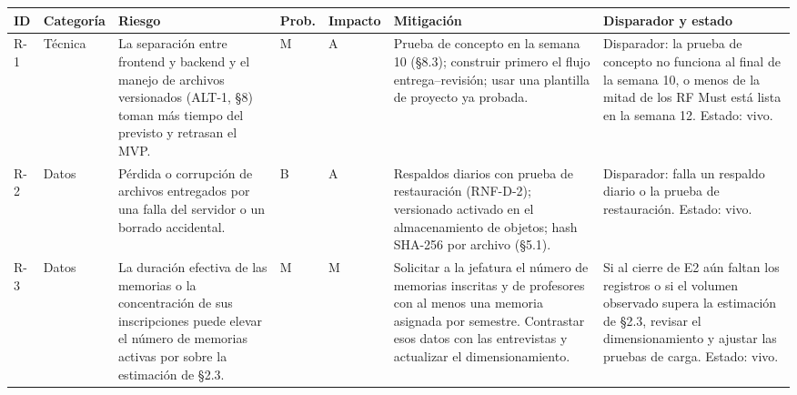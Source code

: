 \documentclass[10pt,a4paper]{article}
\newcommand{\hrow}{\rowcolor{encabezado}}
\newcommand{\h}[1]{\textbf{#1}}
\begin{document}
\begin{xltabular}{\linewidth}{|P{0.8cm}|P{1.9cm}|L|P{0.9cm}|P{1.1cm}|P{3.4cm}|P{3.0cm}|}
\hline\hrow \h{ID} & \h{Categoría} & \h{Riesgo} & \h{Prob.} & \h{Impacto} & \h{Mitigación} & \h{Disparador y estado} \\ \hline
\endhead
R-1 & Técnica & La separación entre frontend y backend y el manejo de archivos versionados (ALT-1, §8) toman más tiempo del previsto y retrasan el MVP. & M & A & Prueba de concepto en la semana 10 (§8.3); construir primero el flujo entrega–revisión; usar una plantilla de proyecto ya probada. & Disparador: la prueba de concepto no funciona al final de la semana 10, o menos de la mitad de los RF Must está lista en la semana 12. Estado: vivo. \\ \hline

R-2 & Datos & Pérdida o corrupción de archivos entregados por una falla del servidor o un borrado accidental. & B & A & Respaldos diarios con prueba de restauración (RNF-D-2); versionado activado en el almacenamiento de objetos; hash SHA-256 por archivo (§5.1). & Disparador: falla un respaldo diario o la prueba de restauración. Estado: vivo. \\ \hline

R-3 & Datos & La duración efectiva de las memorias o la concentración de sus inscripciones puede elevar el número de memorias activas por sobre la estimación de §2.3. & M & M & Solicitar a la jefatura el número de memorias inscritas y de profesores con al menos una memoria asignada por semestre. Contrastar esos datos con las entrevistas y actualizar el dimensionamiento. & Si al cierre de E2 aún faltan los registros o si el volumen observado supera la estimación de §2.3, revisar el dimensionamiento y ajustar las pruebas de carga. Estado: vivo. \\ \hline


\end{xltabular}
\end{document}
